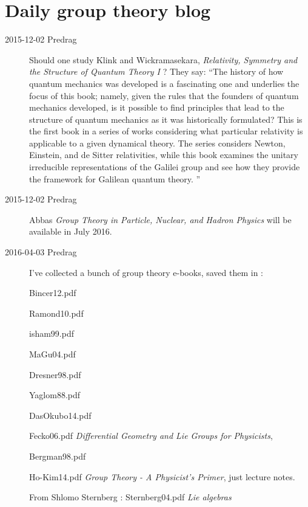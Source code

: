 

\chapter{Daily group theory blog}
\label{s-groupTheBlog}



\begin{description}

\item[2015-12-02  Predrag]
Should one study
Klink and Wickramasekara,
{\em Relativity, Symmetry and the Structure of Quantum Theory I} ?
They say: ``The history of how quantum mechanics was developed is a
fascinating one and underlies the focus of this book; namely, given the
rules that the founders of quantum mechanics developed, is it possible to
find principles that lead to the structure of quantum mechanics as it was
historically formulated? This is the first book in a series of works
considering what particular relativity is applicable to a given dynamical
theory. The series considers Newton, Einstein, and de Sitter
relativities, while this book examines the unitary irreducible
representations of the Galilei group and see how they provide the
framework for Galilean quantum theory.
''

\item[2015-12-02  Predrag] Abbas {\em Group Theory
in Particle, Nuclear, and Hadron Physics} will be available in July 2016.

\item[2016-04-03 Predrag] I've collected a bunch of group theory e-books,
saved them in :

Bincer12.pdf

Ramond10.pdf

isham99.pdf

MaGu04.pdf

Dresner98.pdf

Yaglom88.pdf

DasOkubo14.pdf

Fecko06.pdf
{\em Differential Geometry and Lie Groups for Physicists},

Bergman98.pdf

{Ho-Kim14.pdf} {\em  Group Theory - A Physicist's Primer}, just lecture
notes.

From Shlomo Sternberg
:
Sternberg04.pdf {\em Lie algebras}


\end{description}


\printbibliography[heading=subbibintoc,title={References}]

